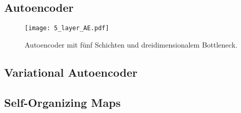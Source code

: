 \subsection{Autoencoder}
\label{ch:TechnikenDerDimRed:sec:ModerneMethoden:subsec:AE}

\begin{figure}[h]
	\label{fig:5-layer-Autoencoder}
	\begin{center}
		\texttt{[image: 5\_layer\_AE.pdf]}
		\caption{Autoencoder mit fünf Schichten und dreidimensionalem Bottleneck.}
	\end{center}
\end{figure}

\subsection{Variational Autoencoder}
\label{ch:TechnikenDerDimRed:sec:ModerneMethoden:subsec:VAE}

\subsection{Self-Organizing Maps}
\label{ch:TechnikenDerDimRed:sec:ModerneMethoden:subsec:SOM}
